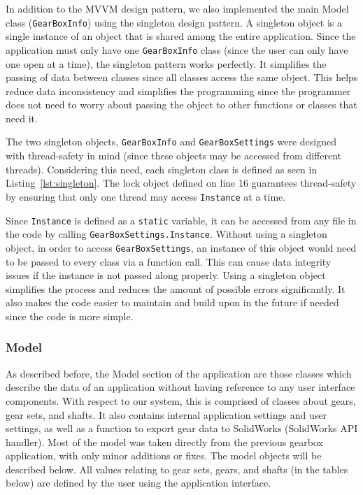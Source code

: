 \begin{doublespace}
In addition to the MVVM design pattern, we also implemented the main Model class (\texttt{GearBoxInfo}) using the singleton design pattern. A singleton object is a single instance of an object that is shared among the entire application. Since the application must only have one \texttt{GearBoxInfo} class (since the user can only have one open at a time), the singleton pattern works perfectly. It simplifies the passing of data between classes since all classes access the same object. This helps reduce data inconsistency and simplifies the programming since the programmer does not need to worry about passing the object to other functions or classes that need it.

The two singleton objects, \texttt{GearBoxInfo} and \texttt{GearBoxSettings} were designed with thread-safety in mind (since these objects may be accessed from different threads). Considering this need, each singleton class is defined as seen in Listing~\ref{lst:singleton}. The lock object defined on line 16 guarantees thread-safety by ensuring that only one thread may access \texttt{Instance} at a time.


Since \texttt{Instance} is defined as a \texttt{static} variable, it can be accessed from any file in the code by calling \texttt{GearBoxSettings.Instance}. Without using a singleton object, in order to access \texttt{GearBoxSettings}, an instance of this object would need to be passed to every class via a function call. This can cause data integrity issues if the instance is not passed along properly. Using a singleton object simplifies the process and reduces the amount of possible errors significantly. It also makes the code easier to maintain and build upon in the future if needed since the code is more simple.

\subsubsection{Model}

As described before, the Model section of the application are those classes which describe the data of an application without having reference to any user interface components. With respect to our system, this is comprised of classes about gears, gear sets, and shafts. It also contains internal application settings and user settings, as well as a function to export gear data to SolidWorks (SolidWorks API handler). Most of the model was taken directly from the previous gearbox application, with only minor additions or fixes. The model objects will be described below. All values relating to gear sets, gears, and shafts (in the tables below) are defined by the user using the application interface.


\end{doublespace}
